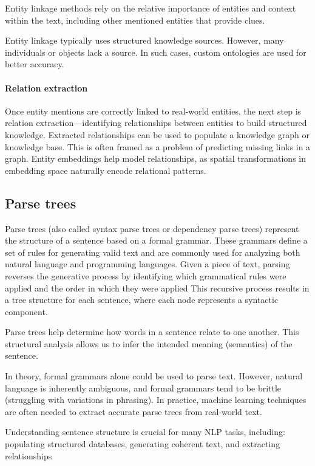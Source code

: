 Entity linkage methods rely on the relative importance of entities and context within the text, including other mentioned entities that provide clues.

Entity linkage typically uses structured knowledge sources. 
However, many individuals or objects lack a source. 
In such cases, custom ontologies are used for better accuracy.

\paragraph*{Relation extraction}
Once entity mentions are correctly linked to real-world entities, the next step is relation extraction—identifying relationships between entities to build structured knowledge.
Extracted relationships can be used to populate a knowledge graph or knowledge base.
This is often framed as a problem of predicting missing links in a graph.
Entity embeddings help model relationships, as spatial transformations in embedding space naturally encode relational patterns.

\subsection{Parse trees}
Parse trees (also called syntax parse trees or dependency parse trees) represent the structure of a sentence based on a formal grammar. 
These grammars define a set of rules for generating valid text and are commonly used for analyzing both natural language and programming languages.
Given a piece of text, parsing reverses the generative process by identifying which grammatical rules were applied and the order in which they were applied
This recursive process results in a tree structure for each sentence, where each node represents a syntactic component.

Parse trees help determine how words in a sentence relate to one another. 
This structural analysis allows us to infer the intended meaning (semantics) of the sentence.

In theory, formal grammars alone could be used to parse text.
However, natural language is inherently ambiguous, and formal grammars tend to be brittle (struggling with variations in phrasing). 
In practice, machine learning techniques are often needed to extract accurate parse trees from real-world text.

Understanding sentence structure is crucial for many NLP tasks, including: populating structured databases, generating coherent text, and extracting relationships

